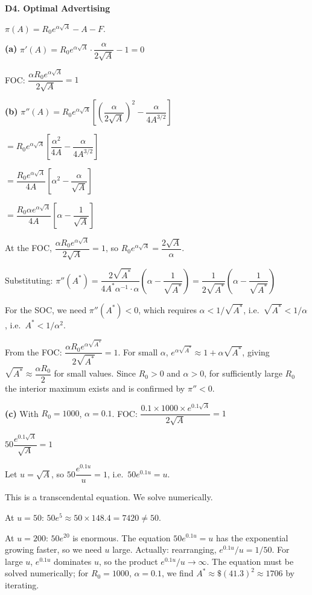 \documentclass[12pt, a4paper]{article}
\theoremstyle{definition}
\begin{document}
\begin{solbox}
\textbf{D4. Optimal Advertising}

$\pi(A) = R_0 e^{\alpha\sqrt{A}} - A - F$.

\textbf{(a)} $\pi'(A) = R_0 e^{\alpha\sqrt{A}}\cdot\dfrac{\alpha}{2\sqrt{A}} - 1 = 0$

FOC: $\dfrac{\alpha R_0 e^{\alpha\sqrt{A}}}{2\sqrt{A}} = 1$

\textbf{(b)} $\pi''(A) = R_0 e^{\alpha\sqrt{A}}\!\left[\left(\dfrac{\alpha}{2\sqrt{A}}\right)^2 - \dfrac{\alpha}{4A^{3/2}}\right]$

$= R_0 e^{\alpha\sqrt{A}}\left[\dfrac{\alpha^2}{4A} - \dfrac{\alpha}{4A^{3/2}}\right]$

$= \dfrac{R_0 e^{\alpha\sqrt{A}}}{4A}\left[\alpha^2 - \dfrac{\alpha}{\sqrt{A}}\right]$

$= \dfrac{R_0\alpha e^{\alpha\sqrt{A}}}{4A}\left[\alpha - \dfrac{1}{\sqrt{A}}\right]$

At the FOC, $\dfrac{\alpha R_0 e^{\alpha\sqrt{A}}}{2\sqrt{A}}=1$, so $R_0 e^{\alpha\sqrt{A}} = \dfrac{2\sqrt{A}}{\alpha}$.

Substituting: $\pi''(A^*) = \dfrac{2\sqrt{A^*}}{4A^*\alpha^{-1}\cdot\alpha}\!\left(\alpha-\dfrac{1}{\sqrt{A^*}}\right)
= \dfrac{1}{2\sqrt{A^*}}\!\left(\alpha-\dfrac{1}{\sqrt{A^*}}\right)$

For the SOC, we need $\pi''(A^*)<0$, which requires $\alpha < 1/\sqrt{A^*}$, i.e.\ $\sqrt{A^*}<1/\alpha$, i.e.\ $A^*<1/\alpha^2$.

From the FOC: $\dfrac{\alpha R_0 e^{\alpha\sqrt{A^*}}}{2\sqrt{A^*}}=1$. For small $\alpha$, $e^{\alpha\sqrt{A^*}}\approx 1+\alpha\sqrt{A^*}$, giving $\sqrt{A^*}\approx\dfrac{\alpha R_0}{2}$ for small values. Since $R_0>0$ and $\alpha>0$, for sufficiently large $R_0$ the interior maximum exists and is confirmed by $\pi''<0$.

\textbf{(c)} With $R_0=1000$, $\alpha=0.1$. FOC:
$\dfrac{0.1\times 1000\times e^{0.1\sqrt{A}}}{2\sqrt{A}} = 1$

$50\dfrac{e^{0.1\sqrt{A}}}{\sqrt{A}} = 1$

Let $u=\sqrt{A}$, so $50\dfrac{e^{0.1u}}{u}=1$, i.e.\ $50e^{0.1u}=u$.

This is a transcendental equation. We solve numerically.

At $u=50$: $50e^5\approx 50\times 148.4=7420\neq 50$.

At $u=200$: $50e^{20}$ is enormous. The equation $50e^{0.1u}=u$ has the exponential growing faster, so we need $u$ large. Actually: rearranging, $e^{0.1u}/u=1/50$. For large $u$, $e^{0.1u}$ dominates $u$, so the product $e^{0.1u}/u\to\infty$. The equation must be solved numerically; for $R_0=1000$, $\alpha=0.1$, we find $A^*\approx\$(41.3)^2\approx 1706$ by iterating.


\end{solbox}
\end{document}
